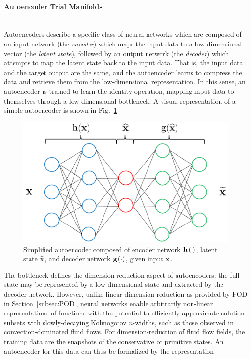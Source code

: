 \paragraph{Autoencoder Trial Manifolds}\mbox{}\\
%
Autoencoders describe a specific class of neural networks which are composed of an input network (the \textit{encoder}) which maps the input data to a low-dimensional vector (the \textit{latent state}), followed by an output network (the \textit{decoder}) which attempts to map the latent state back to the input data. That is, the input data and the target output are the same, and the autoencoder learns to compress the data and retrieve them from the low-dimensional representation. In this sense, an autoencoder is trained to learn the identity operation, mapping input data to themselves through a low-dimensional bottleneck. A visual representation of a simple autoencoder is shown in Fig.~\ref{fig:aeSample}.
%
\begin{figure}
    \centering
    \includegraphics[width=0.75\linewidth]{Chapters/ProjROMs/Images/simpleAE.png}
    \caption{\label{fig:aeSample}Simplified autoencoder composed of encoder network $\mathbf{h} \left(\cdot\right)$, latent state $\mathbf{\widehat{x}}$, and decoder network $\mathbf{g} \left(\cdot\right)$, given input $\mathbf{x}$.}
\end{figure}
%
The bottleneck defines the dimension-reduction aspect of autoencoders: the full state may be represented by a low-dimensional state and extracted by the decoder network. However, unlike linear dimension-reduction as provided by POD in Section~\ref{subsec:POD}, neural networks enable arbitrarily non-linear representations of functions with the potential to efficiently approximate solution subsets with slowly-decaying Kolmogorov $n$-widths, such as those observed in convection-dominated fluid flows. For dimension-reduction of fluid flow fields, the training data are the snapshots of the conservative or primitive states. An autoencoder for this data can thus be formalized by the representation
